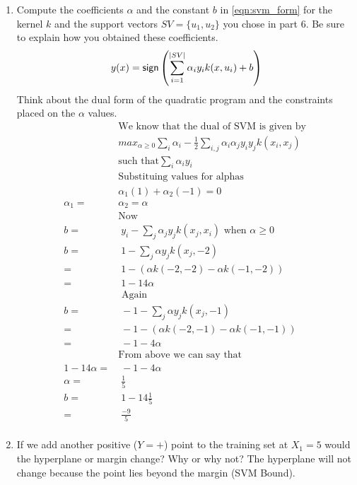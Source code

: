\begin{enumerate}
\begin{enumerate}
  \item {} Compute the coefficients $\alpha$ and the constant
    $b$ in \autoref{eqn:svm_form} for the kernel $k$ and the support
    vectors $SV=\{u_1,u_2\}$ you chose in part 6.  Be sure to explain
    how you obtained these coefficients.
    \begin{eqnarray}
      y(x) = \textsf{sign} \left( \sum_{i=1}^{|SV|} \alpha_i y_i k(x, u_i) + b \right)
      \label{eqn:svm_form}
    \end{eqnarray}
    Think about the dual form of the quadratic program and the
    constraints placed on the $\alpha$ values.
\begin{align*}
	&\text{We know that the dual of SVM is given by }\\
	& max_{\alpha \ge 0} \sum_i \alpha_i - \frac{1}{2} \sum_{i,j} \alpha_i \alpha_j y_i y_j k(x_i,x_j) \\
	& \text{such that} \sum_i \alpha_i y_i \\
	& \text{Substituing values for alphas} \\
	& \alpha_1 (1) + \alpha_2 (-1) = 0 \\
	\alpha_1 =& \alpha_2 = \alpha \\
	&\text{Now }\\
	b =&\; y_i - \sum_j \alpha_j y_j k(x_j , x_i ) \text{ when } \alpha \ge 0 \\
	b =&\; 1 - \sum_j \alpha y_j k(x_j , -2) \\
	=&\; 1 -(\alpha k(-2,-2) - \alpha k(-1,-2)) \\
	=&\; 1 - 14\alpha \\
	&\text{ Again }\\
	b =&\; -1 - \sum_j \alpha y_j k(x_j , -1) \\
	=&\; -1 - (\alpha k(-2,-1) - \alpha k(-1,-1)) \\
	=&\; -1 -4\alpha \\
	& \text{From above we can say that} \\
	1 - 14 \alpha =& \; -1 -4 \alpha \\
	\alpha =&\;  \frac{1}{5} \\
	b = &\; 1 - 14 \frac{1}{5} \\
	=&\; \frac{-9}{5} \\
\end{align*}


  \item {} If we add another positive ($Y=+$) point to the
    training set at $X_1=5$ would the hyperplane or margin change?
    Why or why not?
	The hyperplane will not change because the point lies beyond the margin (SVM Bound).


\end{enumerate}
\end{enumerate}
